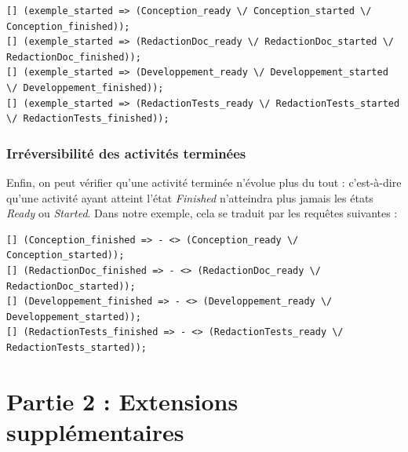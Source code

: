 \documentclass{report}
\begin{document}
\begin{verbatim}
[] (exemple_started => (Conception_ready \/ Conception_started \/ Conception_finished));
[] (exemple_started => (RedactionDoc_ready \/ RedactionDoc_started \/ RedactionDoc_finished));
[] (exemple_started => (Developpement_ready \/ Developpement_started \/ Developpement_finished));
[] (exemple_started => (RedactionTests_ready \/ RedactionTests_started \/ RedactionTests_finished));
\end{verbatim}

\subsection{Irréversibilité des activités terminées}

Enfin, on peut vérifier qu'une activité terminée n'évolue plus du tout : c'est-à-dire qu'une activité ayant atteint l'état \textit{Finished} n'atteindra plus jamais les états \textit{Ready} ou \textit{Started}. Dans notre exemple, cela se traduit par les requêtes suivantes :

\begin{verbatim}
[] (Conception_finished => - <> (Conception_ready \/ Conception_started));
[] (RedactionDoc_finished => - <> (RedactionDoc_ready \/ RedactionDoc_started));
[] (Developpement_finished => - <> (Developpement_ready \/ Developpement_started));
[] (RedactionTests_finished => - <> (RedactionTests_ready \/ RedactionTests_started));
\end{verbatim}

\chapter{Partie 2 : Extensions supplémentaires}


\end{document}
